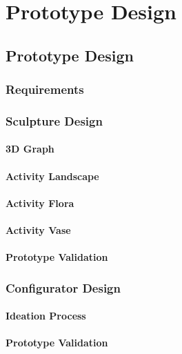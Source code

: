 \chapter{Prototype Design}
\label{ch:proto}
\section{Prototype Design}

\subsection{Requirements}
\subsection{Sculpture Design}
\subsubsection{3D Graph}
\subsubsection{Activity Landscape}
\subsubsection{Activity Flora}
\subsubsection{Activity Vase}
\subsubsection{Prototype Validation}
\subsection{Configurator Design}
\subsubsection{Ideation Process}
\subsubsection{Prototype Validation}
